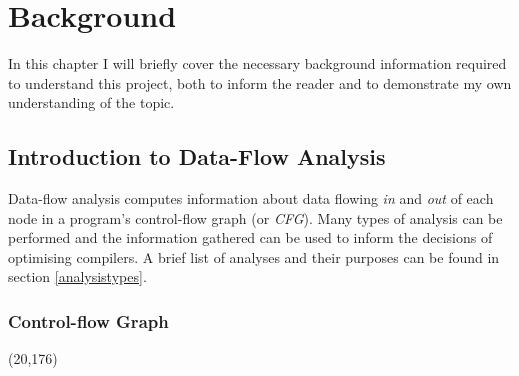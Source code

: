 \documentclass[bsc,twoside,singlespacing,parskip,logo,notimes,normalheadings]{infthesis}
\newcommand{\cfgpoint}[1][]{%
  \draw[magenta, fill=magenta!90] (#1) circle (0.5mm);
}
\begin{document}
\chapter{Background}
In this chapter I will briefly cover the necessary background
information required to understand this project, both to inform the
reader and to demonstrate my own understanding of the topic.

    \section{Introduction to Data-Flow Analysis}
    Data-flow analysis computes information about data flowing {\em
      in} and {\em out} of each node in a program's control-flow graph
    (or {\em CFG}). Many types of analysis can be performed and the
    information gathered can be used to inform the decisions of
    optimising compilers. A brief list of analyses and their purposes
    can be found in section \ref{analysistypes}.
    
        \subsection{Control-flow Graph}

        \begin{textblock}{80}(20,176)
            \captionsetup{width=8cm,justification=justified}
            \label{cfgexample}
        \end{textblock}
\end{document}
